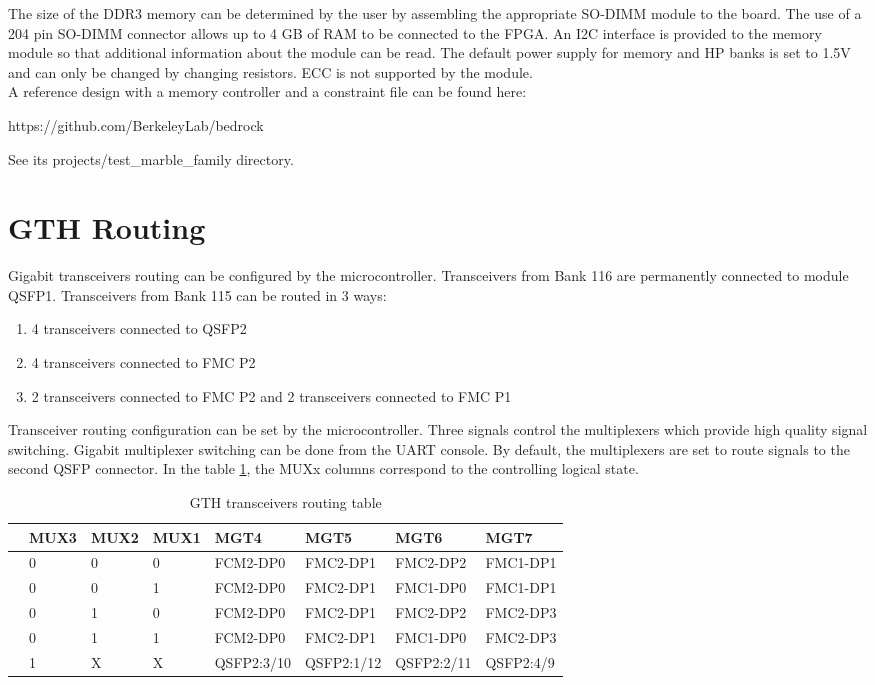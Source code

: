 \documentclass[12pt,oneside,a4]{article}
\begin{document}
The size of the DDR3 memory can be determined by the user by assembling the appropriate SO-DIMM module to the board. The use of a 204 pin SO-DIMM connector allows up to 4 GB of RAM to be connected to the FPGA. An I2C interface is provided to the memory module so that additional information about the module can be read. The default power supply for memory and HP banks is set to 1.5V and can only be changed by changing resistors. ECC is not supported by the module.\\

A reference design with a memory controller and a constraint file can be found here:
\begin{leftbar}
https://github.com/BerkeleyLab/bedrock
\end{leftbar}
See its projects/test\_marble\_family directory.

\section{GTH Routing}
Gigabit transceivers routing can be configured by the microcontroller. Transceivers from Bank 116 are permanently connected to module QSFP1. Transceivers from Bank 115 can be routed in 3 ways:
\begin{enumerate}
    \item 4 transceivers connected to QSFP2
    \item 4 transceivers connected to FMC P2
    \item 2 transceivers connected to FMC P2 and 2 transceivers connected to FMC P1
\end{enumerate}

Transceiver routing configuration can be set by the microcontroller. Three signals control the multiplexers which provide high quality signal switching. Gigabit multiplexer switching can be done from the UART console. By default, the multiplexers are set to route signals to the second QSFP connector. In the table \ref{table}, the MUXx columns correspond to the controlling logical state.

\begin{table}[htbp]
\begin{tabular}{@{}llllllll@{}}
\toprule
 & MUX3 & MUX2 & MUX1 & MGT4       & MGT5       & MGT6       & MGT7      \\ \midrule
 & 0    & 0    & 0    & FCM2-DP0   & FMC2-DP1   & FMC2-DP2   & FMC1-DP1  \\
 & 0    & 0    & 1    & FCM2-DP0   & FMC2-DP1   & FMC1-DP0   & FMC1-DP1  \\
 & 0    & 1    & 0    & FCM2-DP0   & FMC2-DP1   & FMC2-DP2   & FMC2-DP3  \\
 & 0    & 1    & 1    & FCM2-DP0   & FMC2-DP1   & FMC1-DP0   & FMC2-DP3  \\
 & 1    & X    & X    & QSFP2:3/10 & QSFP2:1/12 & QSFP2:2/11 & QSFP2:4/9 \\ \bottomrule
\end{tabular}
\caption{GTH transceivers routing table}\label{table}
\end{table}
\end{document}
